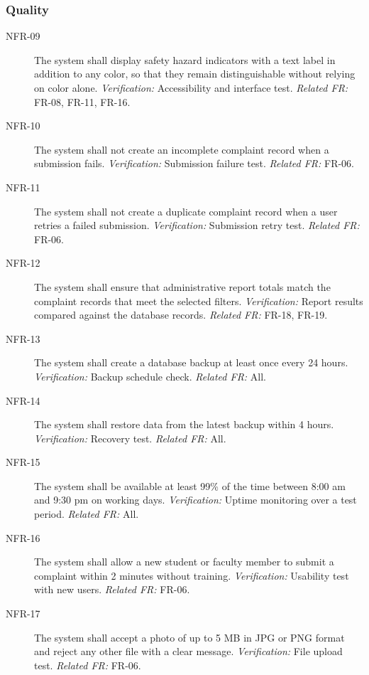 \subsubsection*{Quality}

\begin{description}
  \item[NFR-09] The system shall display safety hazard indicators with a text label in addition to any color, so that they remain distinguishable without relying on color alone. \textit{Verification:} Accessibility and interface test. \textit{Related FR:} FR-08, FR-11, FR-16.
  \item[NFR-10] The system shall not create an incomplete complaint record when a submission fails. \textit{Verification:} Submission failure test. \textit{Related FR:} FR-06.
  \item[NFR-11] The system shall not create a duplicate complaint record when a user retries a failed submission. \textit{Verification:} Submission retry test. \textit{Related FR:} FR-06.
  \item[NFR-12] The system shall ensure that administrative report totals match the complaint records that meet the selected filters. \textit{Verification:} Report results compared against the database records. \textit{Related FR:} FR-18, FR-19.
  \item[NFR-13] The system shall create a database backup at least once every 24 hours. \textit{Verification:} Backup schedule check. \textit{Related FR:} All.
  \item[NFR-14] The system shall restore data from the latest backup within 4 hours. \textit{Verification:} Recovery test. \textit{Related FR:} All.
  \item[NFR-15] The system shall be available at least 99\% of the time between 8:00 am and 9:30 pm on working days. \textit{Verification:} Uptime monitoring over a test period. \textit{Related FR:} All.
  \item[NFR-16] The system shall allow a new student or faculty member to submit a complaint within 2 minutes without training. \textit{Verification:} Usability test with new users. \textit{Related FR:} FR-06.
  \item[NFR-17] The system shall accept a photo of up to 5 MB in JPG or PNG format and reject any other file with a clear message. \textit{Verification:} File upload test. \textit{Related FR:} FR-06.
\end{description}

